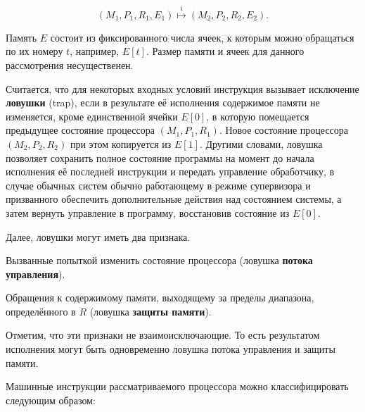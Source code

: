 $$(M_1,P_1,R_1,E_1) \overset{i}\mapsto (M_2,P_2,R_2,E_2).$$ 

Память $E$ состоит из фиксированного числа ячеек, к которым можно обращаться по их номеру $t$, например, $E[t]$. Размер памяти и ячеек для данного рассмотрения несущественен.

Считается, что для некоторых входных условий инструкция вызывает исключение \textbf{ловушки} (\abbr trap), если в результате её исполнения содержимое памяти не изменяется, кроме единственной ячейки $E[0]$, в которую  помещается предыдущее состояние процессора $(M_1,P_1,R_1)$. Новое состояние процессора $(M_2,P_2,R_2)$ при этом копируется из $E[1]$. Другими словами, ловушка позволяет сохранить полное состояние программы на момент до начала исполнения её последней инструкции и передать управление обработчику, в случае обычных систем обычно работающему в режиме супервизора и призванного обеспечить дополнительные действия над состоянием системы, а затем вернуть управление в программу, восстановив состояние из $E[0]$.

Далее, ловушки могут иметь два признака.
\begin{enumerate*}
\item Вызванные попыткой изменить состояние процессора (ловушка \textbf{потока управления}).

\item Обращения к содержимому памяти, выходящему за пределы диапазона, определённого в $R$ (ловушка \textbf{защиты памяти}). 
\end{enumerate*}

Отметим, что эти признаки не взаимоисключающие. То есть результатом исполнения могут быть одновременно ловушка потока управления и защиты памяти.

Машинные инструкции рассматриваемого процессора можно классифицировать следующим образом:

